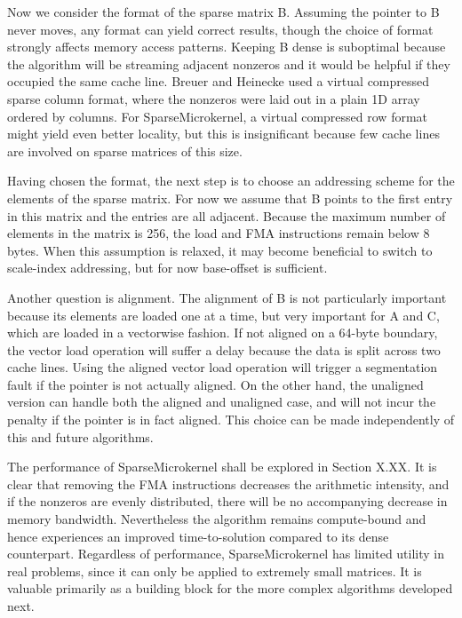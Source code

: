 Now we consider the format of the sparse matrix B. Assuming the pointer to B never moves, any format can yield correct results, though the choice of format strongly affects memory access patterns. Keeping B dense is suboptimal because the algorithm will be streaming adjacent nonzeros and it would be helpful if they occupied the same cache line. Breuer and Heinecke used a virtual compressed sparse column format, where the nonzeros were laid out in a plain 1D array ordered by columns. For SparseMicrokernel, a virtual compressed row format might yield even better locality, but this is insignificant because few cache lines are involved on sparse matrices of this size. 

Having chosen the format, the next step is to choose an addressing scheme for the elements of the sparse matrix. For now we assume that B points to the first entry in this matrix and the entries are all adjacent. Because the maximum number of elements in the matrix is 256, the load and FMA instructions remain below 8 bytes. When this assumption is relaxed, it may become beneficial to switch to scale-index addressing, but for now base-offset is sufficient.

Another question is alignment. The alignment of B is not particularly important because its elements are loaded one at a time, but very important for A and C, which are loaded in a vectorwise fashion. If not aligned on a 64-byte boundary, the vector load operation will suffer a delay because the data is split across two cache lines. Using the aligned vector load operation  will trigger a segmentation fault if the pointer is not actually aligned. On the other hand, the unaligned version  can handle both the aligned and unaligned case, and will not incur the penalty if the pointer is in fact aligned. This choice can be made independently of this and future algorithms.

The performance of SparseMicrokernel shall be explored in Section X.XX. It is clear that removing the FMA instructions decreases the arithmetic intensity, and if the nonzeros are evenly distributed, there will be no accompanying decrease in memory bandwidth. Nevertheless the algorithm remains compute-bound and hence experiences an improved time-to-solution compared to its dense counterpart. Regardless of performance, SparseMicrokernel has limited utility in real problems, since it can only be applied to extremely small matrices. It is valuable primarily as a building block for the more complex algorithms developed next.

